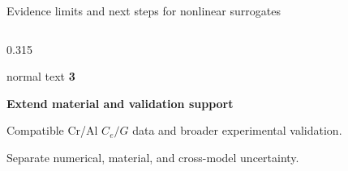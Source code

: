 \documentclass[aspectratio=169,10pt]{beamer}
\begin{document}
\begin{frame}[t]{Evidence limits and next steps for nonlinear surrogates}
\begin{columns}[T,totalwidth=0.96\textwidth]
\begin{column}{0.315\textwidth}
      \begin{beamercolorbox}[wd=\linewidth,sep=0.66em]{normal text}
        \centering
        {\Large\color{GVSourceBlue}\textbf{3}}\par
        \small\textbf{Extend material and validation support}\par
        \vspace{0.16cm}
        \scriptsize\raggedright
        Compatible Cr/Al \(C_e/G\) data and broader experimental validation.\par
        Separate numerical, material, and cross-model uncertainty.
      \end{beamercolorbox}
    \end{column}
  \end{columns}
\end{frame}
\end{document}
